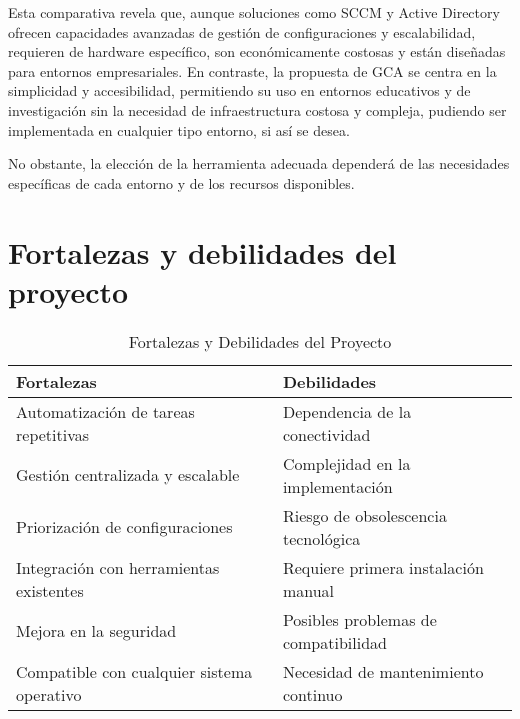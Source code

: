 Esta comparativa revela que, aunque soluciones como SCCM y Active Directory ofrecen capacidades avanzadas de gestión de
configuraciones y escalabilidad, requieren de hardware específico, son económicamente costosas y están diseñadas para
entornos empresariales.
En contraste, la propuesta de GCA se centra en la simplicidad y accesibilidad, permitiendo su uso en entornos educativos
y de investigación sin la necesidad de infraestructura costosa y compleja, pudiendo ser implementada en cualquier
tipo entorno, si así se desea.

No obstante, la elección de la herramienta adecuada dependerá de las necesidades específicas de cada entorno y de los
recursos disponibles.

\section{Fortalezas y debilidades del proyecto}\label{sec:fortalezas-y-debilidades-del-proyecto}

\begin{table}[ht]
    \centering
    \begin{tabular}{@{}p{7cm} p{7cm}@{}}
        \toprule
        \textbf{Fortalezas} & \textbf{Debilidades} \\
        \midrule
        Automatización de tareas repetitivas & Dependencia de la conectividad \\
        Gestión centralizada y escalable & Complejidad en la implementación \\
        Priorización de configuraciones & Riesgo de obsolescencia tecnológica \\
        Integración con herramientas existentes & Requiere primera instalación manual \\
        Mejora en la seguridad & Posibles problemas de compatibilidad \\
        Compatible con cualquier sistema operativo & Necesidad de mantenimiento continuo \\
        \bottomrule
    \end{tabular}
    \caption{Fortalezas y Debilidades del Proyecto}
    \label{tab:fortalezas-debilidades}
\end{table}